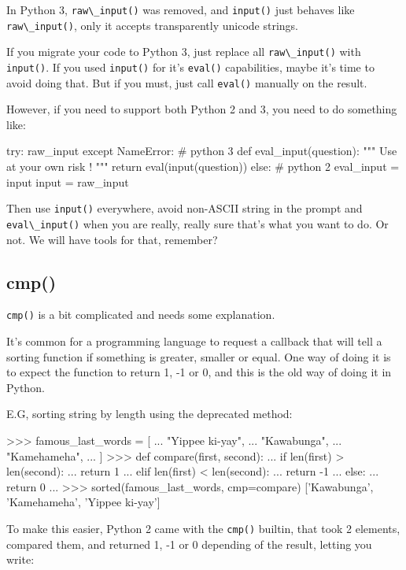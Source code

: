 In Python 3, \lstinline{raw\_input()} was removed, and \lstinline{input()} just behaves like \lstinline{raw\_input()}, only it accepts transparently unicode strings.

If you migrate your code to Python 3, just replace all \lstinline{raw\_input()} with \lstinline{input()}. If you used \lstinline{input()} for it's \lstinline{eval()} capabilities, maybe it's time to avoid doing that. But if you must, just call \lstinline{eval()} manually on the result.

However, if you need to support both Python 2 and 3, you need to do something like:

\begin{py2and3}
try:
    raw\_input
except NameError: # python 3
    def eval_input(question):
        """ Use at your own risk ! """
        return eval(input(question))
else: # python 2
    eval_input = input
    input = raw\_input
\end{py2and3}

Then use \lstinline{input()} everywhere, avoid non-ASCII string in the prompt and \lstinline{eval\_input()} when you are really, really sure that's what you want to do. Or not. We will have tools for that, remember?

\subsection{cmp()}

\lstinline{cmp()} is a bit complicated and needs some explanation.

It's common for a programming language to request a callback that will tell a sorting function if something is greater, smaller or equal. One way of doing it is to expect the function to return 1, -1 or 0, and this is the old way of doing it in Python.

E.G, sorting string by length using the deprecated method:

\begin{py2}
>>> famous_last_words = [
...     "Yippee ki-yay",
...     "Kawabunga",
...     "Kamehameha",
... ]
>>> def compare(first, second):
...     if len(first) > len(second):
...         return 1
...     elif len(first) < len(second):
...         return -1
...     else:
...         return 0
...
>>> sorted(famous_last_words, cmp=compare)
['Kawabunga', 'Kamehameha', 'Yippee ki-yay']
\end{py2}

To make this easier, Python 2 came with the \lstinline{cmp()} builtin, that took 2 elements, compared them, and returned 1, -1 or 0 depending of the result, letting you write:


